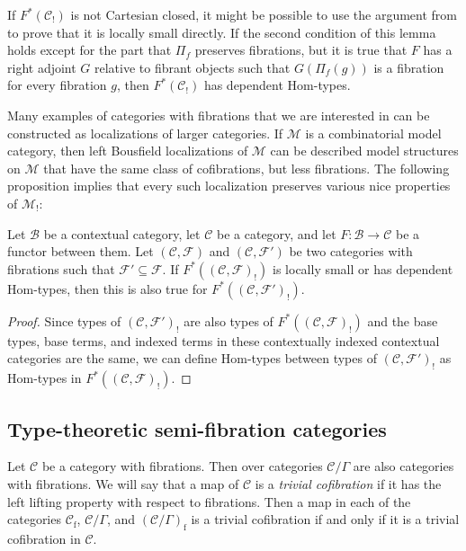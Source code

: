 \documentclass[reqno]{amsart}
\theoremstyle{definition}
\theoremstyle{remark}
\newcommand{\fs}[1]{\mathrm{#1}}
\newcommand{\scat}[1]{\mathcal{#1}}
\newcommand{\Fib}{\mathcal{F}}
\newcommand{\Hom}{\fs{Hom}}
\numberwithin{figure}{section}
\begin{document}
\begin{remark}
If $F^*(\scat{C}_!)$ is not Cartesian closed, it might be possible to use the argument from  to prove that it is locally small directly.
If the second condition of this lemma holds except for the part that $\Pi_f$ preserves fibrations,
but it is true that $F$ has a right adjoint $G$ relative to fibrant objects such that $G(\Pi_f(g))$ is a fibration for every fibration $g$, then $F^*(\scat{C}_!)$ has dependent $\Hom$-types.
\end{remark}

Many examples of categories with fibrations that we are interested in can be constructed as localizations of larger categories.
If $\scat{M}$ is a combinatorial model category, then left Bousfield localizations of $\scat{M}$ can be described model structures on $\scat{M}$ that have the same class of cofibrations, but less fibrations.
The following proposition implies that every such localization preserves various nice properties of $\scat{M}_!$:

\begin{prop}
Let $\scat{B}$ be a contextual category, let $\scat{C}$ be a category, and let $F : \scat{B} \to \scat{C}$ be a functor between them.
Let $(\scat{C},\Fib)$ and $(\scat{C},\Fib')$ be two categories with fibrations such that $\Fib' \subseteq \Fib$.
If $F^*((\scat{C},\Fib)_!)$ is locally small or has dependent $\Hom$-types, then this is also true for $F^*((\scat{C},\Fib')_!)$.
\end{prop}
\begin{proof}
Since types of $(\scat{C},\Fib')_!$ are also types of $F^*((\scat{C},\Fib)_!)$ and the base types, base terms, and indexed terms in these contextually indexed contextual categories are the same,
we can define $\Hom$-types between types of $(\scat{C},\Fib')_!$ as $\Hom$-types in $F^*((\scat{C},\Fib)_!)$.
\end{proof}

\subsection{Type-theoretic semi-fibration categories}

Let $\scat{C}$ be a category with fibrations.
Then over categories $\scat{C}/\Gamma$ are also categories with fibrations.
We will say that a map of $\scat{C}$ is a \emph{trivial cofibration} if it has the left lifting property with respect to fibrations.
Then a map in each of the categories $\scat{C}_\fs{f}$, $\scat{C}/\Gamma$, and $(\scat{C}/\Gamma)_\fs{f}$ is a trivial cofibration if and only if it is a trivial cofibration in $\scat{C}$.
\end{document}
